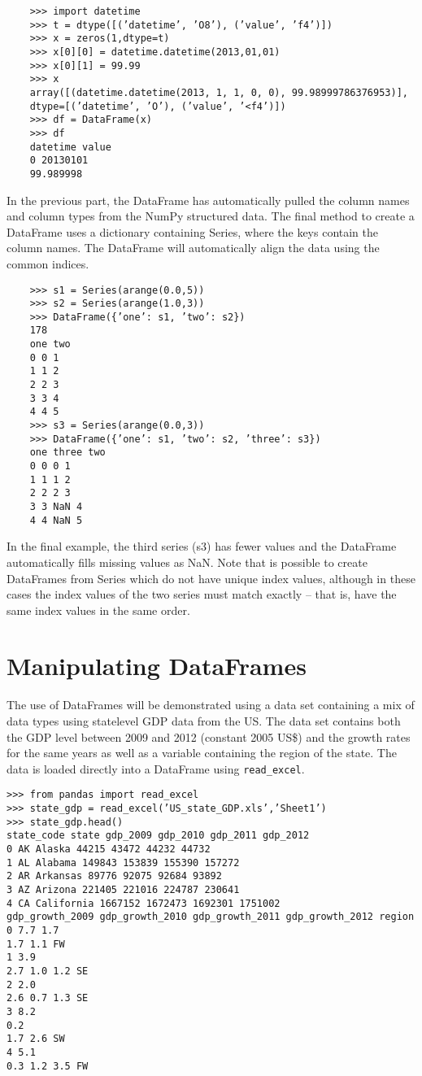 \documentclass[KSmain.tex]{subfiles}
\begin{document}
\begin{framed}
	\begin{verbatim}
	>>> import datetime
	>>> t = dtype([(’datetime’, ’O8’), (’value’, ’f4’)])
	>>> x = zeros(1,dtype=t)
	>>> x[0][0] = datetime.datetime(2013,01,01)
	>>> x[0][1] = 99.99
	>>> x
	array([(datetime.datetime(2013, 1, 1, 0, 0), 99.98999786376953)],
	dtype=[(’datetime’, ’O’), (’value’, ’<f4’)])
	>>> df = DataFrame(x)
	>>> df
	datetime value
	0 20130101
	99.989998
	\end{verbatim}
\end{framed}
In the previous part, the DataFrame has automatically pulled the column names and column types
from the NumPy structured data.
The final method to create a DataFrame uses a dictionary containing Series, where the keys contain
the column names. The DataFrame will automatically align the data using the common indices.
\begin{framed}
	\begin{verbatim}
	>>> s1 = Series(arange(0.0,5))
	>>> s2 = Series(arange(1.0,3))
	>>> DataFrame({’one’: s1, ’two’: s2})
	178
	one two
	0 0 1
	1 1 2
	2 2 3
	3 3 4
	4 4 5
	>>> s3 = Series(arange(0.0,3))
	>>> DataFrame({’one’: s1, ’two’: s2, ’three’: s3})
	one three two
	0 0 0 1
	1 1 1 2
	2 2 2 3
	3 3 NaN 4
	4 4 NaN 5
	\end{verbatim}
\end{framed}
In the final example, the third series (s3) has fewer values and the DataFrame automatically fills missing
values as NaN. Note that is possible to create DataFrames from Series which do not have unique index
values, although in these cases the index values of the two series must match exactly – that is, have the
same index values in the same order.
\section{Manipulating DataFrames}
The use of DataFrames will be demonstrated using a data set containing a mix of data types using statelevel
GDP data from the US. The data set contains both the GDP level between 2009 and 2012 (constant
2005 US\$) and the growth rates for the same years as well as a variable containing the region of the state.
The data is loaded directly into a DataFrame using \texttt{read\_excel}.
\begin{framed}
\begin{verbatim}
>>> from pandas import read_excel
>>> state_gdp = read_excel(’US_state_GDP.xls’,’Sheet1’)
>>> state_gdp.head()
state_code state gdp_2009 gdp_2010 gdp_2011 gdp_2012
0 AK Alaska 44215 43472 44232 44732
1 AL Alabama 149843 153839 155390 157272
2 AR Arkansas 89776 92075 92684 93892
3 AZ Arizona 221405 221016 224787 230641
4 CA California 1667152 1672473 1692301 1751002
gdp_growth_2009 gdp_growth_2010 gdp_growth_2011 gdp_growth_2012 region
0 7.7 1.7
1.7 1.1 FW
1 3.9
2.7 1.0 1.2 SE
2 2.0
2.6 0.7 1.3 SE
3 8.2
0.2
1.7 2.6 SW
4 5.1
0.3 1.2 3.5 FW
\end{verbatim}
\end{framed}
\end{document}
